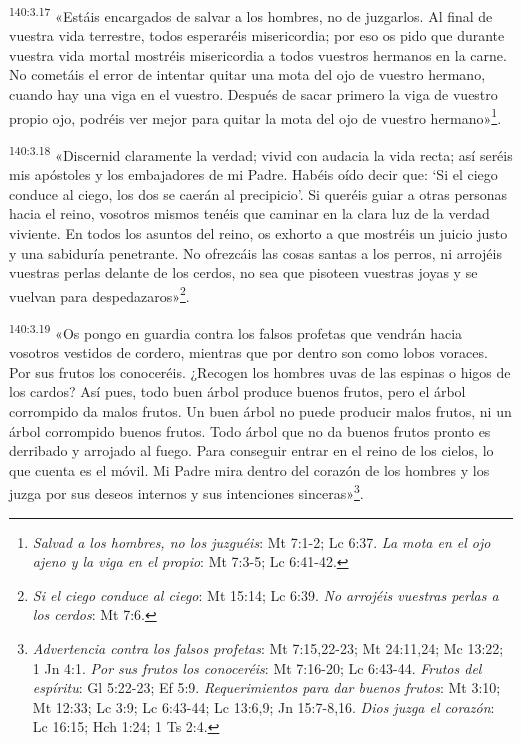 \par 
\textsuperscript{140:3.17} «Estáis encargados de salvar a los hombres, no de juzgarlos. Al final de vuestra vida terrestre, todos esperaréis misericordia; por eso os pido que durante vuestra vida mortal mostréis misericordia a todos vuestros hermanos en la carne. No cometáis el error de intentar quitar una mota del ojo de vuestro hermano, cuando hay una viga en el vuestro. Después de sacar primero la viga de vuestro propio ojo, podréis ver mejor para quitar la mota del ojo de vuestro hermano»\footnote{\textit{Salvad a los hombres, no los juzguéis}: Mt 7:1-2; Lc 6:37. \textit{La mota en el ojo ajeno y la viga en el propio}: Mt 7:3-5; Lc 6:41-42.}.

\par 
\textsuperscript{140:3.18} «Discernid claramente la verdad; vivid con audacia la vida recta; así seréis mis apóstoles y los embajadores de mi Padre. Habéis oído decir que: `Si el ciego conduce al ciego, los dos se caerán al precipicio'. Si queréis guiar a otras personas hacia el reino, vosotros mismos tenéis que caminar en la clara luz de la verdad viviente. En todos los asuntos del reino, os exhorto a que mostréis un juicio justo y una sabiduría penetrante. No ofrezcáis las cosas santas a los perros, ni arrojéis vuestras perlas delante de los cerdos, no sea que pisoteen vuestras joyas y se vuelvan para despedazaros»\footnote{\textit{Si el ciego conduce al ciego}: Mt 15:14; Lc 6:39. \textit{No arrojéis vuestras perlas a los cerdos}: Mt 7:6.}.

\par 
\textsuperscript{140:3.19} «Os pongo en guardia contra los falsos profetas que vendrán hacia vosotros vestidos de cordero, mientras que por dentro son como lobos voraces. Por sus frutos los conoceréis. ¿Recogen los hombres uvas de las espinas o higos de los cardos? Así pues, todo buen árbol produce buenos frutos, pero el árbol corrompido da malos frutos. Un buen árbol no puede producir malos frutos, ni un árbol corrompido buenos frutos. Todo árbol que no da buenos frutos pronto es derribado y arrojado al fuego. Para conseguir entrar en el reino de los cielos, lo que cuenta es el móvil. Mi Padre mira dentro del corazón de los hombres y los juzga por sus deseos internos y sus intenciones sinceras»\footnote{\textit{Advertencia contra los falsos profetas}: Mt 7:15,22-23; Mt 24:11,24; Mc 13:22; 1 Jn 4:1. \textit{Por sus frutos los conoceréis}: Mt 7:16-20; Lc 6:43-44. \textit{Frutos del espíritu}: Gl 5:22-23; Ef 5:9. \textit{Requerimientos para dar buenos frutos}: Mt 3:10; Mt 12:33; Lc 3:9; Lc 6:43-44; Lc 13:6,9; Jn 15:7-8,16. \textit{Dios juzga el corazón}: Lc 16:15; Hch 1:24; 1 Ts 2:4.}.

